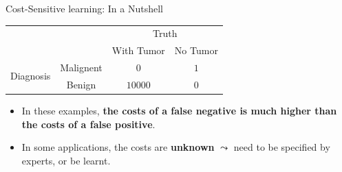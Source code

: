 \documentclass[11pt,compress,t,notes=noshow, xcolor=table]{beamer}
\begin{document}
\begin{vbframe}{Cost-Sensitive learning: In a Nutshell}
{        \begin{minipage}{0.49\textwidth}
            \begin{table}[]
                \centering
                \begin{tabular}{p{1cm}c|cc}
                    & &\multicolumn{2}{c}{Truth} \\
                    & & With Tumor & No Tumor  \\
                    \hline
                    \multirow{2}{*}{\parbox{1cm}{Diagnosis}} & Malignent & 0 & $ 1 $\\
                    & Benign & $10000$ & $0$   \\
                \end{tabular}
            \end{table}
        \end{minipage}
        \hfill
        \begin{minipage}{0.49\textwidth}
            \begin{itemize}
                \scriptsize
                \item In these examples, \textbf{the costs of a false negative is much higher than the costs of a false positive}.
                \vspace{15pt}
                
                \item In some applications, the costs are \textbf{unknown} $\leadsto$ need to be specified by experts, or be learnt.
            \end{itemize}   
        \end{minipage}
		
	}
\end{vbframe}
\end{document}
